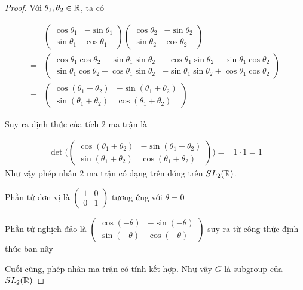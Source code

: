 \begin{proof}
        Với $\theta_1, \theta_2 \in \mathbb{R}$, ta có
        
        \begin{align*}
        & \begin{pmatrix}
            \cos \theta_1 & -\sin \theta_1 \\ \sin \theta_1 & \cos \theta_1
        \end{pmatrix} \begin{pmatrix}
            \cos \theta_2 & -\sin \theta_2 \\ \sin \theta_2 & \cos \theta_2
        \end{pmatrix} \\
        = & \begin{pmatrix}
            \cos \theta_1 \cos \theta_2 - \sin \theta_1 \sin \theta_2 & -\cos \theta_1 \sin \theta_2 - \sin \theta_1 \cos \theta_2 \\ 
            \sin \theta_1 \cos \theta_2 + \cos \theta_1 \sin \theta_2 & -\sin \theta_1 \sin \theta_2 + \cos \theta_1 \cos \theta_2
        \end{pmatrix} \\
        = & \begin{pmatrix}
            \cos (\theta_1 + \theta_2) & -\sin (\theta_1 + \theta_2) \\
            \sin (\theta_1 + \theta_2) & \cos (\theta_1 + \theta_2)
        \end{pmatrix}
        \end{align*}
        
        Suy ra định thức của tích 2 ma trận là

        \begin{align*}
            \det \Biggl(\begin{pmatrix}
                \cos (\theta_1 + \theta_2) & -\sin (\theta_1 + \theta_2) \\
                \sin (\theta_1 + \theta_2) & \cos (\theta_1 + \theta_2)
            \end{pmatrix}\Biggr)
            = & 1 \cdot 1 = 1
        \end{align*}
        Như vậy phép nhân 2 ma trận có dạng trên đóng trên $SL_2 (\mathbb{R})$.
        
        Phần tử đơn vị là $\begin{pmatrix}
        1 & 0 \\ 0 & 1
        \end{pmatrix}$ tương ứng với $\theta = 0$
        
        Phần tử nghịch đảo là $\begin{pmatrix}
        \cos (-\theta) & -\sin (-\theta) \\ \sin (-\theta) & \cos (-\theta)
        \end{pmatrix}$ suy ra từ công thức định thức ban nãy
        
        Cuối cùng, phép nhân ma trận có tính kết hợp. Như vậy $G$ là subgroup của $SL_2 (\mathbb{R})$
        
\end{proof}

